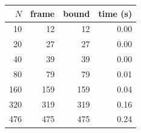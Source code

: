 \begin{tabular}{rrrr}\toprule $N$ & frame & bound & time (s)\\\midrule
10 & 12 & 12 & 0.00\\
20 & 27 & 27 & 0.00\\
40 & 39 & 39 & 0.00\\
80 & 79 & 79 & 0.01\\
160 & 159 & 159 & 0.04\\
320 & 319 & 319 & 0.16\\
476 & 475 & 475 & 0.24\\
\bottomrule\end{tabular}
